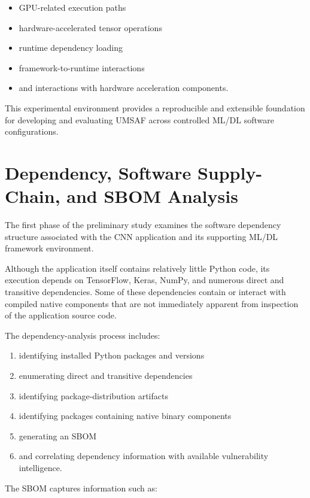 \documentclass[
  12pt,
  letterpaper,
  oneside]{report}
\providecommand{\tightlist}{%
  \setlength{\itemsep}{0pt}\setlength{\parskip}{0pt}}
\begin{document}
\begin{itemize}
\tightlist
\item
  GPU-related execution paths
\item
  hardware-accelerated tensor operations
\item
  runtime dependency loading
\item
  framework-to-runtime interactions
\item
  and interactions with hardware acceleration components.
\end{itemize}

This experimental environment provides a reproducible and extensible
foundation for developing and evaluating UMSAF across controlled ML/DL
software configurations.

\section{Dependency, Software Supply-Chain, and SBOM Analysis}\label{93-dependency-software-supply-chain-and-sbom-analysis}

The first phase of the preliminary study examines the software
dependency structure associated with the CNN application and its
supporting ML/DL framework environment.

Although the application itself contains relatively little Python code,
its execution depends on TensorFlow, Keras, NumPy, and numerous direct
and transitive dependencies. Some of these dependencies contain or
interact with compiled native components that are not immediately
apparent from inspection of the application source code.

The dependency-analysis process includes:

\begin{enumerate}
\def\labelenumi{\arabic{enumi}.}
\tightlist
\item
  identifying installed Python packages and versions
\item
  enumerating direct and transitive dependencies
\item
  identifying package-distribution artifacts
\item
  identifying packages containing native binary components
\item
  generating an SBOM
\item
  and correlating dependency information with available vulnerability
  intelligence.
\end{enumerate}

The SBOM captures information such as:
\end{document}
